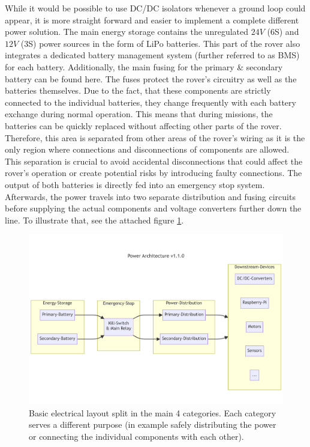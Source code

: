     While it would be possible to use DC/DC isolators whenever a ground loop could appear, it is more straight forward and easier to implement a complete different power solution. The main energy storage contains the unregulated $24V$ (6S) and $12V$ (3S) power sources in the form of LiPo batteries. This part of the rover also integrates a dedicated battery management system (further referred to as BMS) for each battery. Additionally, the main fusing for the primary \& secondary battery can be found here. The fuses protect the rover's circuitry as well as the batteries themselves. Due to the fact, that these components are strictly connected to the individual batteries, they change frequently with each battery exchange during normal operation. This means that during missions, the batteries can be quickly replaced without affecting other parts of the rover. Therefore, this area is separated from other areas of the rover's wiring as it is the only region where connections and disconnections of components are allowed. This separation is crucial to avoid accidental disconnections that could affect the rover's operation or create potential risks by introducing faulty connections. The output of both batteries is directly fed into an emergency stop system. Afterwards, the power travels into two separate distribution and fusing circuits before supplying the actual components and voltage converters further down the line. To illustrate that, see the attached figure \ref{power_architecture}.
    
    \begin{figure}[h] %
        \includegraphics[width=\textwidth]{contents/figures/power-architecture-v1.1.0.png}
        \caption{Basic electrical layout split in the main 4 categories. Each category serves a different purpose (in example safely distributing the power or connecting the individual components with each other).}
         \label{power_architecture}
    \end{figure}

